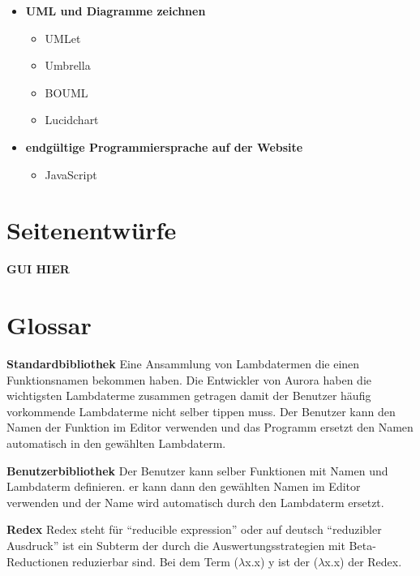 \documentclass[parskip=full,11pt,twoside]{scrartcl}
\begin{document}
\begin{description}
\begin{itemize}
		\item \textbf{UML und Diagramme zeichnen}
			\begin{itemize}
				\item UMLet
				\item Umbrella
				\item BOUML
				\item Lucidchart
			\end{itemize}
		\item \textbf{endgültige Programmiersprache auf der Website}
			\begin{itemize}
				\item JavaScript
			\end{itemize}
	\end{itemize}
\newpage
\appendix
\end{description}
\section{Seitenentwürfe}
\textbf{GUI HIER}


\newpage
\section{Glossar}

\textbf{Standardbibliothek}
\newline
Eine Ansammlung von Lambdatermen die einen Funktionsnamen bekommen haben. Die Entwickler von Aurora haben die wichtigsten Lambdaterme zusammen getragen damit der Benutzer häufig vorkommende Lambdaterme nicht selber tippen muss. Der Benutzer kann den Namen der Funktion im Editor verwenden und das Programm ersetzt den Namen automatisch in den gewählten Lambdaterm.

\textbf{Benutzerbibliothek}
\newline
Der Benutzer kann selber Funktionen mit Namen und Lambdaterm definieren. er kann dann den gewählten Namen im Editor verwenden und der Name wird automatisch durch den Lambdaterm ersetzt.

\textbf {Redex}
\newline
Redex steht für \enquote{reducible expression} oder auf deutsch \enquote{reduzibler Ausdruck} ist ein Subterm der durch die Auswertungsstrategien mit Beta-Reductionen reduzierbar sind.
Bei dem Term ($\lambda$x.x) y ist der ($\lambda$x.x) der Redex.
\end{document}
